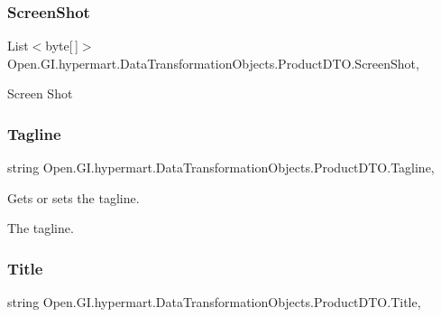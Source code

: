 \subsubsection{\texorpdfstring{Screen\+Shot}{ScreenShot}}
{\footnotesize\ttfamily List$<$byte\mbox{[}$\,$\mbox{]}$>$ Open.\+G\+I.\+hypermart.\+Data\+Transformation\+Objects.\+Product\+D\+T\+O.\+Screen\+Shot\hspace{0.3cm}{\ttfamily [get]}, {\ttfamily [set]}}



Screen Shot 

\hypertarget{class_open_1_1_g_i_1_1hypermart_1_1_data_transformation_objects_1_1_product_d_t_o_a7b9cf190d3a304a72287dc1c0200aa94}{}\label{class_open_1_1_g_i_1_1hypermart_1_1_data_transformation_objects_1_1_product_d_t_o_a7b9cf190d3a304a72287dc1c0200aa94} 
\subsubsection{\texorpdfstring{Tagline}{Tagline}}
{\footnotesize\ttfamily string Open.\+G\+I.\+hypermart.\+Data\+Transformation\+Objects.\+Product\+D\+T\+O.\+Tagline\hspace{0.3cm}{\ttfamily [get]}, {\ttfamily [set]}}



Gets or sets the tagline. 

The tagline. \hypertarget{class_open_1_1_g_i_1_1hypermart_1_1_data_transformation_objects_1_1_product_d_t_o_a6f03b28697c295061d5c914d5598efef}{}\label{class_open_1_1_g_i_1_1hypermart_1_1_data_transformation_objects_1_1_product_d_t_o_a6f03b28697c295061d5c914d5598efef} 
\subsubsection{\texorpdfstring{Title}{Title}}
{\footnotesize\ttfamily string Open.\+G\+I.\+hypermart.\+Data\+Transformation\+Objects.\+Product\+D\+T\+O.\+Title\hspace{0.3cm}{\ttfamily [get]}, {\ttfamily [set]}}



